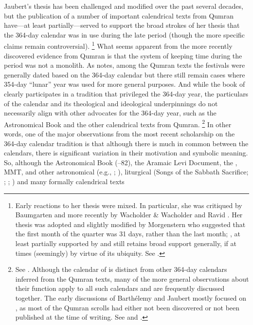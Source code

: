 Jaubert's thesis has been challenged and modified over the past several decades, but the publication of a number of important calendrical texts from Qumran have---at least partially---served to support the broad strokes of her thesis that the 364-day calendar was in use during the late \secondtemple period (though the more specific claims remain controversial).%
    \footnote{%
        Early reactions to her thesis were mixed. In particular, she was critiqued by Baumgarten 
        \cite*{baumgarten_baumgarten1977} and more recently by Wacholder \& Wacholder 
        \cite*{wacholder-wacholder_huca1995} and Ravid 
        \cite*{ravid_dsd2003}. Her thesis was adopted and slightly modified by Morgenstern who suggested that the first month of the quarter was 31 days, rather than the last month; 
        \cite*{morgenstern_vt1955}, at least partially supported by \vanderkam 
        \cite*[410--411]{vanderkam_cbq1979} and still retains broad support generally, if at times (seemingly) by virtue of its ubiquity. See 
        \cite[142]{bendov-saulnier_cbr2008}.}
What seems apparent from the more recently discovered evidence from Qumran is that the system of keeping time during the \secondtemple period was not a monolith. As \vanderkam notes, among the Qumran texts the festivals were generally dated based on the 364-day calendar but there still remain cases where 354-day ``lunar'' year was used for more general purposes.\autocite[1:45]{vanderkam2018} And while the book of \jub clearly participates in a tradition that privileged the 364-day year, the particulars of the \jub calendar and its theological and ideological underpinnings do not necessarily align with other advocates for the 364-day year, such as the Astronomical Book and the other calendrical texts from Qumran.%
    \footnote{%
        See 
        \cite[159]{bendov-saulnier_cbr2008}. Although the calendar of \jub is distinct from other 364-day calendars inferred from the Qumran texts, many of the more general observations about their function apply to all such calendars and are frequently discussed together. The early discussions of Barthélemy and Jaubert mostly focused on \jub, as most of the Qumran scrolls had either not been discovered or not been published at the time of writing. See 
        \cite{barthelemy_rb1952} and 
        \cite{jaubert_vt1957}.}
In other words, one of the major observations from the most recent scholarship on the 364-day calendar tradition is that although there is much in common between the calendars, there is significant variation in their motivation and symbolic meaning. So, although the Astronomical Book (--82), the Aramaic Levi Document, the  \templescroll, MMT,  and other astronomical (e.g., ; ), liturgical (Songs of the Sabbath Sacrifice; ; ; ) and many formally calendrical texts%
